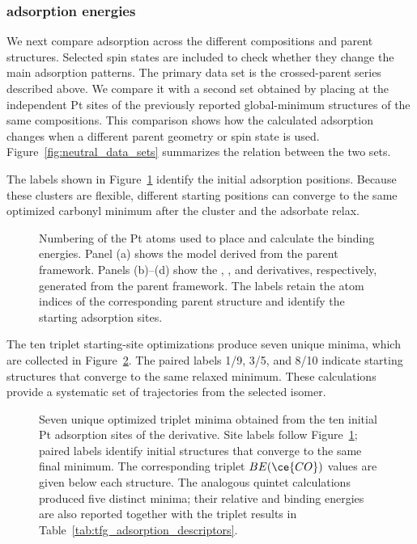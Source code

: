 \subsubsection[CO adsorption energies]{ adsorption energies}

We next compare  adsorption across the different compositions and parent
structures. Selected spin states are included to check whether they change the
main adsorption patterns. The primary data set is the crossed-parent series described
above. We compare it with a second set obtained by placing  at the
independent Pt sites of the previously reported global-minimum structures of
the same compositions.\cite{ugartemendia:2022} This comparison shows how the
calculated adsorption changes when a different parent geometry or spin state
is used. Figure~\ref{fig:neutral_data_sets} summarizes the relation between
the two sets.


The labels shown in Figure~\ref{fig:tfg_site_numbering} identify the initial
adsorption positions. Because these clusters are flexible, different starting
positions can converge to the same optimized carbonyl minimum after the
cluster and the adsorbate relax.

\begin{figure}[H]
\centering


\caption{Numbering of the Pt atoms used to place  and calculate the
 binding energies. Panel (a) shows the  model derived
from the  parent framework. Panels (b)--(d) show the ,
, and  derivatives,
respectively, generated from the  parent framework. The labels retain
the atom indices of the corresponding parent structure and identify the
starting adsorption sites.}
\label{fig:tfg_site_numbering}
\end{figure}


The ten triplet starting-site optimizations produce seven unique
 minima, which are collected in
Figure~\ref{fig:tfg_pt10co_series}. The paired labels 1/9, 3/5, and 8/10
indicate starting structures that converge to the same relaxed minimum. These
calculations provide a systematic set of trajectories from the selected
 isomer.

\begin{figure}[H]
\centering

\caption{Seven unique optimized triplet  minima obtained from the
ten initial Pt adsorption sites of the  derivative. Site
labels follow Figure~\ref{fig:tfg_site_numbering}; paired labels identify
initial structures that converge to the same final minimum. The corresponding
triplet $BE(\ce{CO})$ values are given below each structure. {The
analogous quintet calculations produced five distinct minima; their relative
and binding energies are also reported together with the triplet results in
Table~\ref{tab:tfg_adsorption_descriptors}.}}
\label{fig:tfg_pt10co_series}
\end{figure}

